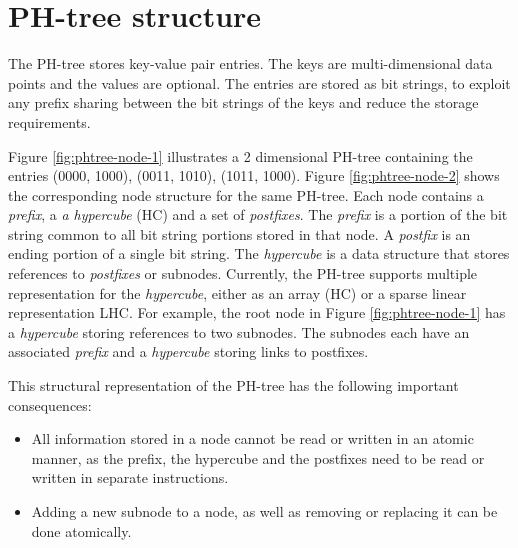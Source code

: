 \documentclass[11pt,a4paper]{globis-book}
\begin{document}
\section{PH-tree structure}

The PH-tree stores key-value pair entries. The keys are multi-dimensional data points and the values are optional. The entries are stored as bit strings, to exploit any prefix sharing between the bit strings of the keys and reduce the storage requirements. 

Figure \ref{fig:phtree-node-1} illustrates a 2 dimensional PH-tree containing  the entries (0000, 1000), (0011, 1010), (1011, 1000). Figure \ref{fig:phtree-node-2} shows the corresponding node structure for the same PH-tree. Each node contains a \textit{prefix}, a \textit{a hypercube} (HC) and a set of \textit{postfixes}. The \textit{prefix} is a portion of the bit string common to all bit string portions stored in that node. A \textit{postfix} is an ending portion of a single bit string. The \textit{hypercube} is a data structure that stores references to \textit{postfixes} or subnodes. Currently, the PH-tree supports multiple representation for the \textit{hypercube}, either as an array (HC) or a sparse linear representation {LHC}. For example, the root node in Figure \ref{fig:phtree-node-1} has a \textit{hypercube} storing references to two subnodes. The subnodes each have an associated \textit{prefix} and a \textit{hypercube} storing links to postfixes. 

This structural representation of the PH-tree has the following important consequences:
\begin{itemize}
    \item All information stored in a node cannot be read or written in an atomic manner, as the prefix, the hypercube and the postfixes need to be read or written in separate instructions. 
    \item Adding a new subnode to a node, as well as removing or replacing it can be done atomically.      
\end{itemize} 
\end{document}
